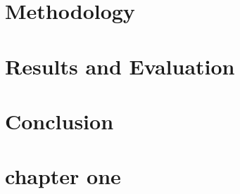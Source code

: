 \documentclass[12pt, a4paper]{report}
\newcommand\blankpage{%
    \null
    \thispagestyle{empty}%
    \newpage}
\begin{document}
\graphicspath{{./references/images/}}
\VerbatimFootnotes

\pagestyle{empty}






\afterpage{\blankpage}

\tableofcontents
\thispagestyle{empty}


\newpage

\listoffigures
\thispagestyle{empty}


\newpage

\listoftables
\thispagestyle{empty}


\newpage

\listofalgorithms
\thispagestyle{empty}


\newpage

\pagestyle{fancy}
\fancyhead[R]{\thepage}
\fancyfoot{}









\chapter{Methodology}

\chapter{Results and Evaluation}

\chapter{Conclusion}


\newpage


\nocite{*}


\appendix
\chapter{chapter one}
\end{document}
